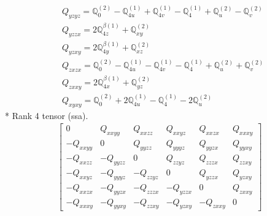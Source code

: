 \documentclass[fleqn,8pt,landscape]{jsarticle}
\begin{document}
\begin{align*}
& Q_{yzyz} = \mathbb{Q}_{0}^{(2)} - \mathbb{Q}_{4u}^{(1)} + \mathbb{Q}_{4v}^{(1)} - \mathbb{Q}_{4}^{(1)} + \mathbb{Q}_{u}^{(2)} - \mathbb{Q}_{v}^{(2)} \\
& Q_{yzzx} = 2 \mathbb{Q}_{4z}^{\beta(1)} + \mathbb{Q}_{xy}^{(2)} \\
& Q_{yzxy} = 2 \mathbb{Q}_{4y}^{\beta(1)} + \mathbb{Q}_{xz}^{(2)} \\
& Q_{zxzx} = \mathbb{Q}_{0}^{(2)} - \mathbb{Q}_{4u}^{(1)} - \mathbb{Q}_{4v}^{(1)} - \mathbb{Q}_{4}^{(1)} + \mathbb{Q}_{u}^{(2)} + \mathbb{Q}_{v}^{(2)} \\
& Q_{zxxy} = 2 \mathbb{Q}_{4x}^{\beta(1)} + \mathbb{Q}_{yz}^{(2)} \\
& Q_{xyxy} = \mathbb{Q}_{0}^{(2)} + 2 \mathbb{Q}_{4u}^{(1)} - \mathbb{Q}_{4}^{(1)} - 2 \mathbb{Q}_{u}^{(2)}
\end{align*}
* Rank 4 tensor (ssa).
\begin{align*}
\begin{bmatrix} 0 & Q_{xxyy} & Q_{xxzz} & Q_{xxyz} & Q_{xxzx} & Q_{xxxy} \\ - Q_{xxyy} & 0 & Q_{yyzz} & Q_{yyyz} & Q_{yyzx} & Q_{yyxy} \\ - Q_{xxzz} & - Q_{yyzz} & 0 & Q_{zzyz} & Q_{zzzx} & Q_{zzxy} \\ - Q_{xxyz} & - Q_{yyyz} & - Q_{zzyz} & 0 & Q_{yzzx} & Q_{yzxy} \\ - Q_{xxzx} & - Q_{yyzx} & - Q_{zzzx} & - Q_{yzzx} & 0 & Q_{zxxy} \\ - Q_{xxxy} & - Q_{yyxy} & - Q_{zzxy} & - Q_{yzxy} & - Q_{zxxy} & 0 \end{bmatrix}
\end{align*}
\end{document}
